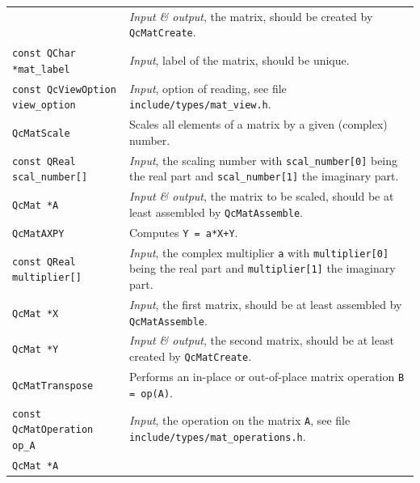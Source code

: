 \documentclass[a4paper,11pt,twoside,openright]{book}
\begin{document}
\begin{center}
\begin{longtable}{l|p{}}
      & \textsl{Input \& output}, the matrix, should be created by \verb|QcMatCreate|.\\
    \hspace*{2ex}\verb|const QChar *mat_label| %
      & \textsl{Input}, label of the matrix, should be unique.\\
    \hspace*{2ex}\verb|const QcViewOption view_option| %
      & \textsl{Input}, option of reading, see file
        \verb|include/types/mat_view.h|.\\
    \hline
%
    \verb|QcMatScale|\index{\texttt{QcMatScale}} %
      & Scales all elements of a matrix by a given (complex) number.\\
    \hspace*{2ex}\verb|const QReal scal_number[]| %
      & \textsl{Input}, the scaling number with \verb|scal_number[0]| being the
        real part and \verb|scal_number[1]| the imaginary part.\\
    \hspace*{2ex}\verb|QcMat *A| %
      & \textsl{Input \& output}, the matrix to be scaled, should be at least assembled
        by \verb|QcMatAssemble|.\\
    \hline
%
    \verb|QcMatAXPY|\index{\texttt{QcMatAXPY}} %
      & Computes \verb|Y = a*X+Y|.\\
    \hspace*{2ex}\verb|const QReal multiplier[]| %
      & \textsl{Input}, the complex multiplier \verb|a| with \verb|multiplier[0]|
        being the real part and \verb|multiplier[1]| the imaginary part.\\
    \hspace*{2ex}\verb|QcMat *X| %
      & \textsl{Input}, the first matrix, should be at least assembled
        by \verb|QcMatAssemble|.\\
    \hspace*{2ex}\verb|QcMat *Y| %
      & \textsl{Input \& output}, the second matrix, should be at least created
        by \verb|QcMatCreate|.\\
    \hline
%
    \verb|QcMatTranspose|\index{\texttt{QcMatTranspose}} %
      & Performs an in-place or out-of-place matrix operation \verb|B = op(A)|.\\
    \hspace*{2ex}\verb|const QcMatOperation op_A| %
      & \textsl{Input}, the operation on the matrix \verb|A|, see file
        \verb|include/types/mat_operations.h|.\\
    \hspace*{2ex}\verb|QcMat *A| %

\end{longtable}
\end{center}
\end{document}

